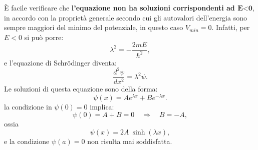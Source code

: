 \documentclass[a4paper,12pt,oneside]{book}
\begin{document}
È facile verificare che \textbf{l'equazione non ha soluzioni corrispondenti ad $\textbf{E<0}$}, in accordo con la proprietà generale secondo cui gli autovalori dell'energia sono sempre maggiori del minimo del potenziale, in questo caso $V_{min}=0$. Infatti, per $E<0$ si può porre:
	\begin{equation}
		\lambda ^2 = -\frac{2mE}{\hbar ^2},
	\end{equation}
e l'equazione di Schr\"{o}dinger diventa:
	\begin{equation}
		\frac{d^2 \psi}{dx^2}=\lambda ^2\psi.
	\end{equation}
Le soluzioni di questa equazione sono della forma:
	\begin{equation}
		\psi(x)= Ae^{\lambda x}+ Be^{-\lambda x}.
	\end{equation}
la condizione in $\psi (0)=0$ implica:
	\begin{equation}
		\psi(0)= A+ B=0 \quad \Rightarrow \quad B=-A,
	\end{equation}
ossia
	\begin{equation}
		\psi(x)= 2A\ \sinh{\left( \lambda x \right)},
	\end{equation}
e la condizione $\psi(a)=0$ non risulta mai soddisfatta.\\
\end{document}
